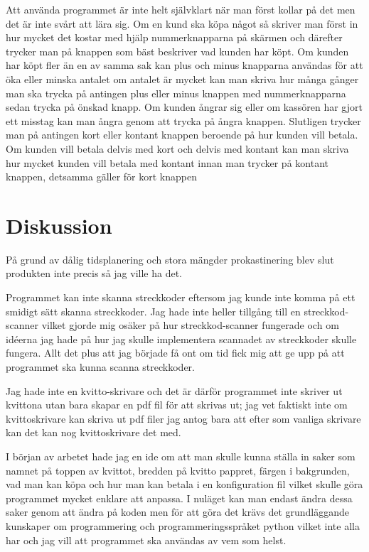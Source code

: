 \documentclass[a4paper, 12pt]{article}
\begin{document}
Att använda programmet är inte helt självklart när man först kollar på det men det är inte svårt att lära sig.
Om en kund ska köpa något så skriver man först in hur mycket det kostar med hjälp nummerknapparna på skärmen och därefter trycker man på knappen som bäst beskriver vad kunden har köpt.
Om kunden har köpt fler än en av samma sak kan plus och minus knapparna användas för att öka eller minska antalet om antalet är mycket kan man skriva hur många gånger man ska trycka på antingen plus eller minus knappen med nummerknapparna sedan trycka på önskad knapp.
 Om kunden ångrar sig eller om kassören har gjort ett misstag kan man ångra genom att trycka på ångra knappen.
 Slutligen trycker man på antingen kort eller kontant knappen beroende på hur kunden vill betala. Om kunden vill betala delvis med kort och delvis med kontant kan man skriva hur mycket kunden vill betala med kontant innan man trycker på kontant knappen, detsamma gäller för kort knappen


\section{Diskussion}

På grund av dålig tidsplanering och stora mängder prokastinering blev slut produkten inte precis så jag ville ha det.


Programmet kan inte skanna streckkoder eftersom jag kunde inte komma på ett smidigt sätt skanna streckkoder. 
Jag hade inte heller tillgång till en streckkod-scanner vilket gjorde mig osäker på hur streckkod-scanner fungerade och om idéerna jag hade på hur jag skulle implementera scannadet av streckkoder skulle fungera. Allt det plus att jag började få ont om tid fick mig att ge upp på att programmet ska kunna scanna streckkoder.


Jag hade inte en kvitto-skrivare och det är därför programmet inte skriver ut kvittona utan bara skapar en pdf fil för att skrivas ut; jag vet faktiskt inte om kvittoskrivare kan skriva ut pdf filer jag antog bara att efter som vanliga skrivare kan det kan nog kvittoskrivare det med.


I början av arbetet hade jag en ide om att man skulle kunna ställa in saker som namnet på toppen av kvittot, bredden på kvitto pappret, färgen i bakgrunden, vad man kan köpa och hur man kan betala i en konfiguration fil vilket skulle göra programmet mycket enklare att anpassa. I nuläget kan man endast ändra dessa saker genom att ändra på koden men för att göra det krävs det grundläggande kunskaper om programmering och programmeringsspråket python vilket inte alla har och jag vill att programmet ska användas av vem som helst.
\end{document}
